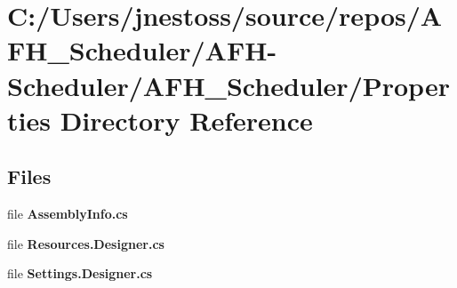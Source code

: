 \section{C\+:/\+Users/jnestoss/source/repos/\+A\+F\+H\+\_\+\+Scheduler/\+A\+F\+H-\/\+Scheduler/\+A\+F\+H\+\_\+\+Scheduler/\+Properties Directory Reference}
\label{dir_d14c7b8ca8190699a8c5a73d1f93484a}
\subsection*{Files}
\begin{DoxyCompactItemize}
\item 
file \textbf{ Assembly\+Info.\+cs}
\item 
file \textbf{ Resources.\+Designer.\+cs}
\item 
file \textbf{ Settings.\+Designer.\+cs}
\end{DoxyCompactItemize}
